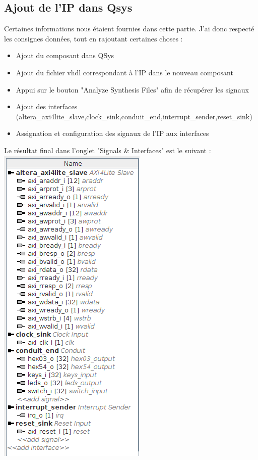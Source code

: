 \subsection{Ajout de l'IP dans Qsys}
Certaines informations nous étaient fournies dans cette partie. J'ai donc respecté les consignes données, tout en rajoutant certaines choses :\\
\begin{itemize}
	\item Ajout du composant dans QSys
	\item Ajout du fichier vhdl correspondant à l'IP dans le nouveau composant
	\item Appui sur le bouton "Analyze Synthesis Files" afin de récupérer les signaux
	\item Ajout des interfaces (altera\_axi4lite\_slave,clock\_sink,conduit\_end,interrupt\_sender,reset\_sink)
	\item Assignation et configuration des signaux de l'IP aux interfaces\\
\end{itemize}
Le résultat final dans l'onglet "Signals \& Interfaces" est le suivant : \\
\includegraphics[scale=0.6]{./images/axilite_ip_signals_interface.png}

